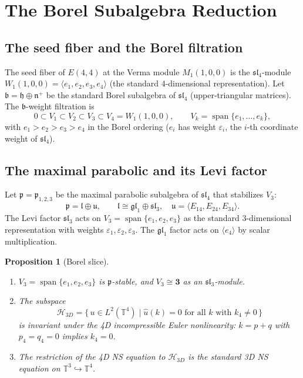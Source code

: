 \documentclass[reqno,10pt]{amsart}
\theoremstyle{plain}
\newtheorem{proposition}[theorem]{Proposition}
\theoremstyle{definition}
\def\slN{{\mathfrak{sl}}_4}
\def\sliii{{\mathfrak{sl}}_3}
\def\bfrak{\mathfrak{b}}
\def\pfrak{\mathfrak{p}}
\def\lfrak{\mathfrak{l}}
\def\ufrak{\mathfrak{u}}
\def\hfrak{\mathfrak{h}}
\def\nfrak{\mathfrak{n}}
\begin{document}
\section{The Borel Subalgebra Reduction}\label{sec:borel}

\subsection{The seed fiber and the Borel filtration}

The seed fiber of $E(4,4)$ at the Verma module $M_1(1,0,0)$ is the
$\slN$-module $W_1(1,0,0) = \langle e_1,e_2,e_3,e_4\rangle$ (the standard
4-dimensional representation).  Let $\bfrak = \hfrak \oplus \nfrak^+$ be
the standard Borel subalgebra of $\slN$ (upper-triangular matrices).  The
$\bfrak$-weight filtration is
\begin{equation}\label{eq:flag}
  0 \subset V_1 \subset V_2 \subset V_3 \subset V_4 = W_1(1,0,0),
  \qquad V_k = \operatorname{span}\{e_1,\ldots,e_k\},
\end{equation}
with $e_1 > e_2 > e_3 > e_4$ in the Borel ordering ($e_i$ has weight
$\varepsilon_i$, the $i$-th coordinate weight of $\slN$).

\subsection{The maximal parabolic and its Levi factor}

Let $\pfrak = \pfrak_{1,2,3}$ be the maximal parabolic subalgebra of
$\slN$ that stabilizes $V_3$:
\[
  \pfrak = \lfrak \oplus \ufrak, \qquad
  \lfrak \cong \mathfrak{gl}_1 \oplus \sliii, \quad
  \ufrak = \langle E_{14}, E_{24}, E_{34} \rangle.
\]
The Levi factor $\sliii$ acts on $V_3 = \operatorname{span}\{e_1,e_2,e_3\}$
as the standard 3-dimensional representation with weights
$\varepsilon_1, \varepsilon_2, \varepsilon_3$.
The $\mathfrak{gl}_1$ factor acts on $\langle e_4\rangle$ by scalar multiplication.

\begin{proposition}[Borel slice]\label{prop:borel}
  \begin{enumerate}
    \item[\rm(i)] $V_3 = \operatorname{span}\{e_1,e_2,e_3\}$ is
          $\pfrak$-stable, and $V_3 \cong \mathbf{3}$ as an
          $\sliii$-module.
    \item[\rm(ii)] The subspace
          \[
            \mathcal{H}_{3D} = \bigl\{\,u \in L^2(\mathbb{T}^4)\;\big|\;
            \hat{u}(k) = 0 \text{ for all } k \text{ with } k_4 \neq 0\,\bigr\}
          \]
          is invariant under the 4D incompressible Euler nonlinearity:
          $k = p+q$ with $p_4 = q_4 = 0$ implies $k_4 = 0$.
    \item[\rm(iii)] The restriction of the 4D NS equation to
          $\mathcal{H}_{3D}$ is the standard 3D NS equation on
          $\mathbb{T}^3 \hookrightarrow \mathbb{T}^4$.
  \end{enumerate}
\end{proposition}
\end{document}
